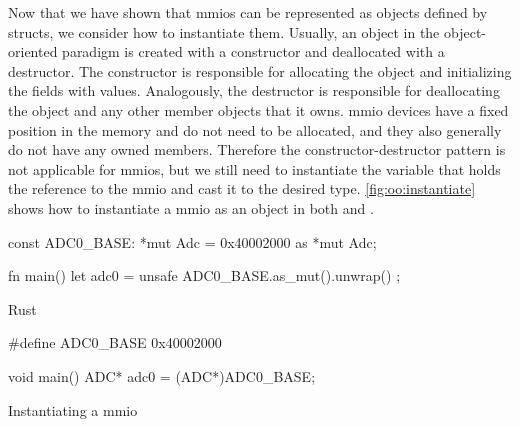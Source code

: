 Now that we have shown that \glspl{mmio} can be represented as objects defined by structs, we consider how to instantiate them.
Usually, an object in the object-oriented paradigm is created with a constructor and deallocated with a destructor.
The constructor is responsible for allocating the object and initializing the fields with values.
Analogously, the destructor is responsible for deallocating the object and any other member objects that it owns.
\gls{mmio} devices have a fixed position in the memory and do not need to be allocated, and they also generally do not have any owned members.
Therefore the constructor-destructor pattern is not applicable for \gls{mmio}s, but we still need to instantiate the variable that holds the reference to the \gls{mmio} and cast it to the desired type.
\autoref{fig:oo:instantiate} shows how to instantiate a \gls{mmio} as an object in both {\C} and {\rust}.

\begin{listing}[H]
  \begin{minipage}{0.46\textwidth}
  \begin{listing}
    \begin{rustcode}
const ADC0_BASE: *mut Adc
      = 0x40002000 as *mut Adc;

fn main() {
  let adc0 = unsafe {
    ADC0_BASE.as_mut().unwrap()
  };
}
    \end{rustcode}
    \caption{Rust}
  \end{listing}
  \end{minipage}
  \hfill
  \begin{minipage}{0.45\textwidth}
  \begin{listing}
    \begin{ccode}
#define ADC0_BASE 0x40002000

void main() {
  ADC* adc0 = (ADC*)ADC0_BASE;
}
    \end{ccode}
    \caption{{\C}}
  \end{listing}
  \end{minipage}
  \caption{Instantiating a \gls{mmio}}
  \label{fig:oo:instantiate}
\end{listing}

